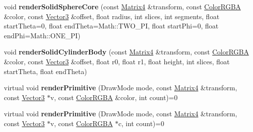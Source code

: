 \begin{DoxyCompactItemize}
\item 
void {\bfseries render\+Solid\+Sphere\+Core} (const \hyperlink{class_magnum_1_1_matrix4}{Matrix4} \&transform, const \hyperlink{class_magnum_1_1_color_r_g_b_a}{Color\+R\+G\+BA} \&color, const \hyperlink{class_magnum_1_1_vector3}{Vector3} \&offset, float radius, int slices, int segments, float start\+Theta=0, float end\+Theta=Math\+::\+T\+W\+O\+\_\+\+PI, float start\+Phi=0, float end\+Phi=Math\+::\+O\+N\+E\+\_\+\+PI)\hypertarget{class_magnum_1_1_i_component_debug_renderer_a4eb339c3ed885ef40d61129347dd30ab}{}\label{class_magnum_1_1_i_component_debug_renderer_a4eb339c3ed885ef40d61129347dd30ab}

\item 
void {\bfseries render\+Solid\+Cylinder\+Body} (const \hyperlink{class_magnum_1_1_matrix4}{Matrix4} \&transform, const \hyperlink{class_magnum_1_1_color_r_g_b_a}{Color\+R\+G\+BA} \&color, const \hyperlink{class_magnum_1_1_vector3}{Vector3} \&offset, float r0, float r1, float height, int slices, float start\+Theta, float end\+Theta)\hypertarget{class_magnum_1_1_i_component_debug_renderer_abd7539bede12d4e28e309233bc70588f}{}\label{class_magnum_1_1_i_component_debug_renderer_abd7539bede12d4e28e309233bc70588f}

\item 
virtual void {\bfseries render\+Primitive} (Draw\+Mode mode, const \hyperlink{class_magnum_1_1_matrix4}{Matrix4} \&transform, const \hyperlink{class_magnum_1_1_vector3}{Vector3} $\ast$v, const \hyperlink{class_magnum_1_1_color_r_g_b_a}{Color\+R\+G\+BA} \&color, int count)=0\hypertarget{class_magnum_1_1_i_component_debug_renderer_af4b58091ad7024f4196a331e20f2f7c0}{}\label{class_magnum_1_1_i_component_debug_renderer_af4b58091ad7024f4196a331e20f2f7c0}

\item 
virtual void {\bfseries render\+Primitive} (Draw\+Mode mode, const \hyperlink{class_magnum_1_1_matrix4}{Matrix4} \&transform, const \hyperlink{class_magnum_1_1_vector3}{Vector3} $\ast$v, const \hyperlink{class_magnum_1_1_color_r_g_b_a}{Color\+R\+G\+BA} $\ast$c, int count)=0\hypertarget{class_magnum_1_1_i_component_debug_renderer_aa921b0cbfae6473cde8cc194bec2bab3}{}\label{class_magnum_1_1_i_component_debug_renderer_aa921b0cbfae6473cde8cc194bec2bab3}

\end{DoxyCompactItemize}
